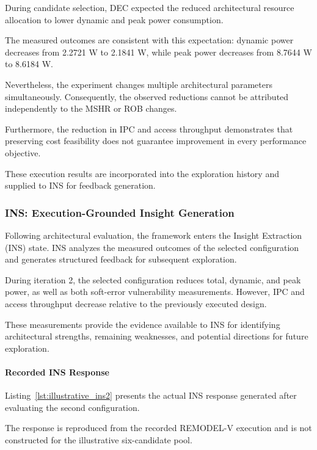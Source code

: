 During candidate selection, DEC expected
the reduced architectural resource
allocation to lower dynamic and peak
power consumption.

The measured outcomes are consistent
with this expectation: dynamic power
decreases from 2.2721 W to 2.1841 W,
while peak power decreases from
8.7644 W to 8.6184 W.

Nevertheless, the experiment changes
multiple architectural parameters
simultaneously. Consequently, the
observed reductions cannot be attributed
independently to the MSHR or ROB changes.

Furthermore, the reduction in IPC
and access throughput demonstrates
that preserving cost feasibility
does not guarantee improvement in
every performance objective.

These execution results are incorporated
into the exploration history and supplied
to INS for feedback generation.



\subsubsection{INS: Execution-Grounded Insight Generation}
\label{app:illustrative_ins2}

Following architectural evaluation, the framework
enters the Insight Extraction (INS) state.
INS analyzes the measured outcomes of the
selected configuration and generates structured
feedback for subsequent exploration.

During iteration 2, the selected configuration
reduces total, dynamic, and peak power, as well
as both soft-error vulnerability measurements.
However, IPC and access throughput decrease
relative to the previously executed design.

These measurements provide the evidence
available to INS for identifying architectural
strengths, remaining weaknesses, and potential
directions for future exploration.

\paragraph{Recorded INS Response}

Listing~\ref{lst:illustrative_ins2} presents
the actual INS response generated after
evaluating the second configuration.

The response is reproduced from the recorded
REMODEL-V execution and is not constructed
for the illustrative six-candidate pool.

